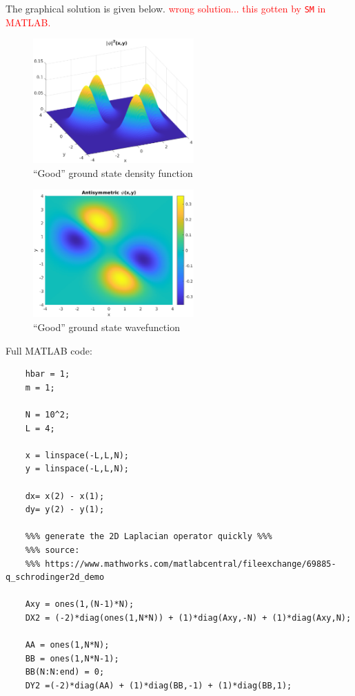 \documentclass{article}
\theoremstyle{definition}
\begin{document}
\begin{enumerate}[label=(\alph*)]
	The graphical solution is given below. \textcolor{red}{wrong solution... this gotten by \texttt{SM} in MATLAB.}
	
	\begin{figure}[!htb]
		\centering
		\includegraphics[width=0.55\textwidth]{problem3c1.eps}
		\caption{``Good'' ground state density function}
	\end{figure}
	
	\begin{figure}[!htb]
		\centering
		\includegraphics[width=0.55\textwidth]{problem3c2.eps}
		\caption{``Good'' ground state wavefunction}
	\end{figure}


	Full MATLAB code:
	\begin{lstlisting}
	hbar = 1;
	m = 1;
	
	N = 10^2;
	L = 4;
	
	x = linspace(-L,L,N);
	y = linspace(-L,L,N);
	
	dx= x(2) - x(1);
	dy= y(2) - y(1);
	
	%%% generate the 2D Laplacian operator quickly %%%
	%%% source:
	%%% https://www.mathworks.com/matlabcentral/fileexchange/69885-q_schrodinger2d_demo 
	
	Axy = ones(1,(N-1)*N);
	DX2 = (-2)*diag(ones(1,N*N)) + (1)*diag(Axy,-N) + (1)*diag(Axy,N);
	
	AA = ones(1,N*N);
	BB = ones(1,N*N-1);
	BB(N:N:end) = 0;
	DY2 =(-2)*diag(AA) + (1)*diag(BB,-1) + (1)*diag(BB,1);
	

\end{lstlisting}
\end{enumerate}
\end{document}
